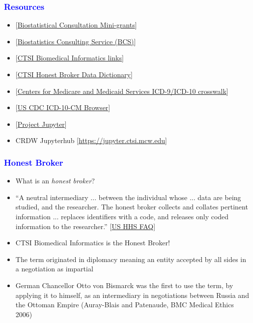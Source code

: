 \documentclass[11pt,pdftex,dvipsnames,usenames]{beamer}
\begin{document}
\begin{frame}[fragile]\frametitle{\bf\textcolor{blue}{Resources}}

\begin{itemize}
\item \textcolor{PineGreen}{[\href{https://ctsi.mcw.edu/investigator/services/ctsi-mini-grants/biostatistical-consultation}
{Biostatistical Consultation Mini-grants}]}
\item \textcolor{PineGreen}{[\href{https://www.mcw.edu/departments/biostatistics/biostatistics-consulting-service}{Biostatistics Consulting Service (BCS)}]}
\item \textcolor{PineGreen}{[\href{https://ctri.mcw.edu/resources/bmi-links}{CTSI Biomedical Informatics links}]}
\item \textcolor{PineGreen}{[\href{https://ctri.mcw.edu/wp-content/uploads/CTSI-Honest-Broker-Data-Dictionary.pdf}{CTSI Honest Broker Data Dictionary}]}
\item \textcolor{PineGreen}{[\href{https://www.nber.org/research/data/icd-9-cm-and-icd-10-cm-and-icd-10-pcs-crosswalk-or-general-equivalence-mappings}
{Centers for Medicare and Medicaid Services ICD-9/ICD-10 crosswalk}]}
\item \textcolor{PineGreen}{[\href{https://icd10cmtool.cdc.gov}
{US CDC ICD-10-CM Browser}]}
\item \textcolor{PineGreen}{[\href{https://en.wikipedia.org/wiki/Project_Jupyter}{Project Jupyter}]}
\item CRDW Jupyterhub \textcolor{PineGreen}{[\href{https://jupyter.ctsi.mcw.edu}{https://jupyter.ctsi.mcw.edu}]}
\end{itemize}

\end{frame}


\begin{frame}[fragile]\frametitle{\bf\textcolor{blue}{Honest Broker}}

\begin{itemize}
\item What is an {\it honest broker}?
\item
``A neutral intermediary ... between the individual whose ... data are being studied, and the researcher. The honest broker collects and collates pertinent information ... replaces identifiers with a code, and releases only coded information to the researcher.''
 \textcolor{PineGreen}{[\href{https://www.hhs.gov/ohrp/sachrp-committee/recommendations/2011-october-13-letter-attachment-d/index.html}{US
     HHS FAQ}]}
\item CTSI Biomedical Informatics is the Honest Broker!
\item The term originated in diplomacy meaning an entity
accepted by all sides in a negotiation as impartial
\item German Chancellor Otto von Bismarck was the first to use the
  term, by applying it to himself, as an intermediary in negotiations
  between Russia and the Ottoman Empire (Auray-Blais and Patenaude,
  BMC Medical Ethics 2006)
\end{itemize}

\end{frame}
\end{document}
